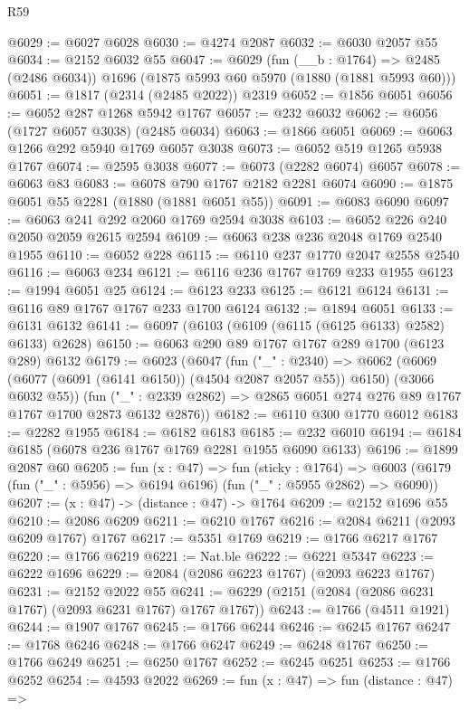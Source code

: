\begin{lexlean}{R59}
\begin{coremodule}
@6029 := @6027 @6028
@6030 := @4274 @2087
@6032 := @6030 @2057 @55
@6034 := @2152 @6032 @55
@6047 := @6029
    (fun (__b : @1764) => @2485 (@2486 @6034))
    @1696
    (@1875 @5993 @60 @5970 (@1880 (@1881 @5993 @60)))
@6051 := @1817 (@2314 (@2485 @2022)) @2319
@6052 := @1856 @6051
@6056 := @6052 @287 @1268 @5942 @1767
@6057 := @232 @6032
@6062 := @6056 (@1727 @6057 @3038) (@2485 @6034)
@6063 := @1866 @6051
@6069 := @6063 @1266 @292 @5940 @1769 @6057 @3038
@6073 := @6052 @519 @1265 @5938 @1767
@6074 := @2595 @3038
@6077 := @6073 (@2282 @6074) @6057
@6078 := @6063 @83
@6083 := @6078 @790 @1767 @2182 @2281 @6074
@6090 := @1875 @6051 @55 @2281 (@1880 (@1881 @6051 @55))
@6091 := @6083 @6090
@6097 := @6063 @241 @292 @2060 @1769 @2594 @3038
@6103 := @6052 @226 @240 @2050 @2059 @2615 @2594
@6109 := @6063 @238 @236 @2048 @1769 @2540 @1955
@6110 := @6052 @228
@6115 := @6110 @237 @1770 @2047 @2558 @2540
@6116 := @6063 @234
@6121 := @6116 @236 @1767 @1769 @233 @1955
@6123 := @1994 @6051 @25
@6124 := @6123 @233
@6125 := @6121 @6124
@6131 := @6116 @89 @1767 @1767 @233 @1700 @6124
@6132 := @1894 @6051
@6133 := @6131 @6132
@6141 := @6097 (@6103 (@6109 (@6115 (@6125 @6133) @2582) @6133) @2628)
@6150 := @6063 @290 @89 @1767 @1767 @289 @1700 (@6123 @289) @6132
@6179 := @6023
    (@6047
      (fun ("_" : @2340) =>
      @6062 (@6069 (@6077 (@6091 (@6141 @6150)) (@4504 @2087 @2057 @55)) @6150) (@3066 @6032 @55))
      (fun ("_" : @2339 @2862) => @2865 @6051 @274 @276 @89 @1767 @1767 @1700 @2873 @6132 @2876))
@6182 := @6110 @300 @1770 @6012
@6183 := @2282 @1955
@6184 := @6182 @6183
@6185 := @232 @6010
@6194 := @6184 @6185 (@6078 @236 @1767 @1769 @2281 @1955 @6090 @6133)
@6196 := @1899 @2087 @60
@6205 := fun (x : @47) =>
  fun (sticky : @1764) =>
  @6003 (@6179 (fun ("_" : @5956) => @6194 @6196) (fun ("_" : @5955 @2862) => @6090))
@6207 := (x : @47) -> (distance : @47) -> @1764
@6209 := @2152 @1696 @55
@6210 := @2086 @6209
@6211 := @6210 @1767
@6216 := @2084 @6211 (@2093 @6209 @1767) @1767
@6217 := @5351 @1769
@6219 := @1766 @6217 @1767
@6220 := @1766 @6219
@6221 := Nat.ble
@6222 := @6221 @5347
@6223 := @6222 @1696
@6229 := @2084 (@2086 @6223 @1767) (@2093 @6223 @1767)
@6231 := @2152 @2022 @55
@6241 := @6229 (@2151 (@2084 (@2086 @6231 @1767) (@2093 @6231 @1767) @1767 @1767))
@6243 := @1766 (@4511 @1921)
@6244 := @1907 @1767
@6245 := @1766 @6244
@6246 := @6245 @1767
@6247 := @1768 @6246
@6248 := @1766 @6247
@6249 := @6248 @1767
@6250 := @1766 @6249
@6251 := @6250 @1767
@6252 := @6245 @6251
@6253 := @1766 @6252
@6254 := @4593 @2022
@6269 := fun (x : @47) =>
  fun (distance : @47) =>

\end{coremodule}
\end{lexlean}
